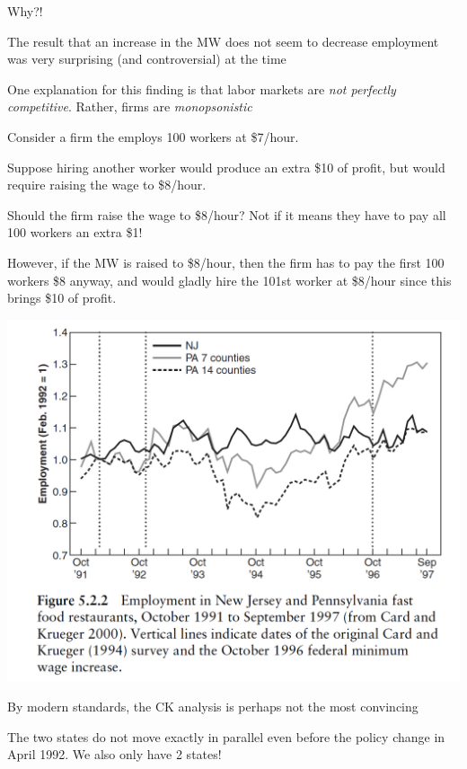 \documentclass[11pt,english,handout]{beamer}
\newenvironment{wideitemize}{\itemize\addtolength{\itemsep}{10pt}}{\enditemize}
\begin{document}
\begin{frame}{Why?!}
	\begin{wideitemize}
		\item
		The result that an increase in the MW does not seem to decrease employment was very surprising (and controversial) at the time
		
		\pause
		\item 
		One explanation for this finding is that labor markets are \textit{not perfectly competitive}. Rather, firms are \textit{monopsonistic}
		
		\pause
		\begin{wideitemize}
			\item
			Consider a firm the employs 100 workers at \$7/hour.
			
			\item
			Suppose hiring another worker would produce an  extra \$10 of profit, but would require raising the wage to \$8/hour.
			
			\pause
			\item
			Should the firm raise the wage to \$8/hour? \pause Not if it means they have to pay all 100 workers an extra \$1!
			
			\pause
			\item
			However, if the MW is raised to \$8/hour, then the firm has to pay the first 100 workers \$8 anyway, and would gladly hire the 101st worker at \$8/hour since this brings \$10 of profit.
		\end{wideitemize}
	\end{wideitemize}
\end{frame}


\begin{frame}
\includegraphics[width = 0.7 \linewidth]{ck_pretrends}	
	
\begin{wideitemize}
	\item
	By modern standards, the CK analysis is perhaps not the most convincing
	
	\pause
	\item
	The two states do not move exactly in parallel even before the policy change in April 1992. \pause
	We also only have 2 states!
\end{wideitemize}
\end{frame}	
\end{document}
